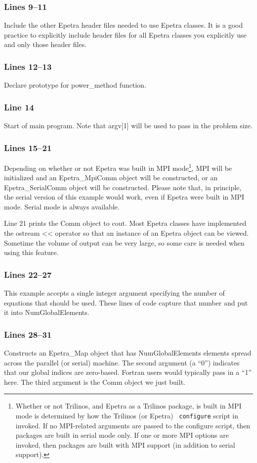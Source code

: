 \documentclass[12pt,relax]{EpetraUserGuide}
\newcommand{\serialcomm}{Epetra\_SerialComm}
\newcommand{\mpicomm}{Epetra\_MpiComm}
\newcommand{\map}{Epetra\_Map}
\begin{document}
\subsubsection{Lines 9--11}
Include the other Epetra header files needed to use Epetra classes.
It is a good practice to explicitly include header files for all
Epetra classes you explicitly use and only those header files.
\subsubsection{Lines 12--13}
Declare prototype for power_method function.
\subsubsection{Line 14}
Start of main program.  Note that argv[1] will be used to pass in the
problem size.
\subsubsection{Lines 15--21}
Depending on whether or not Epetra was built in MPI
mode\footnote{Whether or not Trilinos, and Epetra as a Trilinos package, is built
in MPI mode is determined by how the Trilinos (or Epetra) {\tt
configure} script in invoked.  If no MPI-related arguments are passed
to the configure script, then packages are built in serial mode only.
If one or more MPI options are invoked, then packages are built with
MPI support (in addition to serial support).}, MPI will be initialized
and an \mpicomm{} object will be constructed, or an \serialcomm{}
object will be constructed.  Please note that, in principle, the serial
version of this example would work, even if Epetra were built in MPI
mode.  Serial mode is always available.

Line 21 prints the Comm object to cout.  Most Epetra classes have
implemented the ostream << operator so that an instance of an Epetra
object can be viewed.  Sometime the volume of output can be very
large, so some care is needed when using this feature.
\subsubsection{Lines 22--27}
This example accepts a single integer argument
specifying the number of equations that should be used.  These lines
of code capture that number and put it into NumGlobalElements.
\subsubsection{Lines 28--31}
Constructs an \map{} object that has NumGlobalElements elements spread
across the parallel (or serial) machine.  The second argument (a
``0'') indicates that our global indices are zero-based.  Fortran
users would typically pass in a ``1'' here.  The third argument is the
Comm object we just built.
\end{document}
